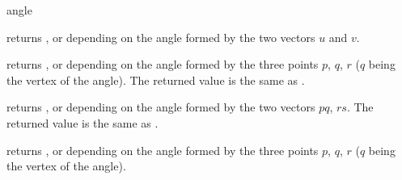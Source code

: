 \begin{ccRefFunction}{angle}

\ccHtmlNoLinks
{}
{returns ,  or  depending
on the angle formed by the two vectors $u$ and $v$.}

\ccHtmlNoLinks
{}
{returns ,  or  depending
on the angle formed by the three points $p$, $q$, $r$ ($q$ being the vertex of
the angle). The returned value is the same as .}

\ccHtmlNoLinks
{}
{returns ,  or  depending
on the angle formed by the two vectors $pq$, $rs$. The returned value is
the same as .}

\ccHtmlNoLinks
{}
{returns ,  or  depending
on the angle formed by the three points $p$, $q$, $r$ ($q$ being the vertex of
the angle).}

\end{ccRefFunction}


